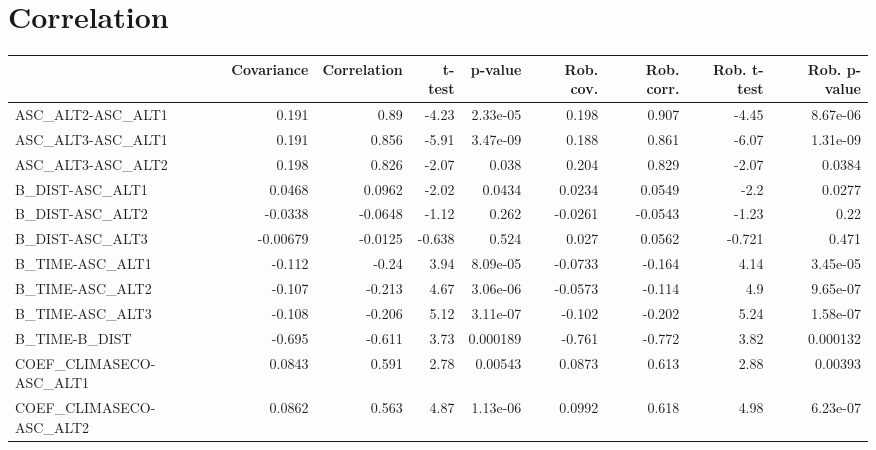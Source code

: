 \section{Correlation}
\begin{tabular}{lrrrrrrrr}
\toprule
{} &  Covariance &  Correlation &  t-test &  p-value &  Rob. cov. &  Rob. corr. &  Rob. t-test &  Rob. p-value \\
\midrule
ASC\_ALT2-ASC\_ALT1              &       0.191 &         0.89 &   -4.23 & 2.33e-05 &      0.198 &       0.907 &        -4.45 &      8.67e-06 \\
ASC\_ALT3-ASC\_ALT1              &       0.191 &        0.856 &   -5.91 & 3.47e-09 &      0.188 &       0.861 &        -6.07 &      1.31e-09 \\
ASC\_ALT3-ASC\_ALT2              &       0.198 &        0.826 &   -2.07 &    0.038 &      0.204 &       0.829 &        -2.07 &        0.0384 \\
B\_DIST-ASC\_ALT1                &      0.0468 &       0.0962 &   -2.02 &   0.0434 &     0.0234 &      0.0549 &         -2.2 &        0.0277 \\
B\_DIST-ASC\_ALT2                &     -0.0338 &      -0.0648 &   -1.12 &    0.262 &    -0.0261 &     -0.0543 &        -1.23 &          0.22 \\
B\_DIST-ASC\_ALT3                &    -0.00679 &      -0.0125 &  -0.638 &    0.524 &      0.027 &      0.0562 &       -0.721 &         0.471 \\
B\_TIME-ASC\_ALT1                &      -0.112 &        -0.24 &    3.94 & 8.09e-05 &    -0.0733 &      -0.164 &         4.14 &      3.45e-05 \\
B\_TIME-ASC\_ALT2                &      -0.107 &       -0.213 &    4.67 & 3.06e-06 &    -0.0573 &      -0.114 &          4.9 &      9.65e-07 \\
B\_TIME-ASC\_ALT3                &      -0.108 &       -0.206 &    5.12 & 3.11e-07 &     -0.102 &      -0.202 &         5.24 &      1.58e-07 \\
B\_TIME-B\_DIST                  &      -0.695 &       -0.611 &    3.73 & 0.000189 &     -0.761 &      -0.772 &         3.82 &      0.000132 \\
COEF\_CLIMASECO-ASC\_ALT1        &      0.0843 &        0.591 &    2.78 &  0.00543 &     0.0873 &       0.613 &         2.88 &       0.00393 \\
COEF\_CLIMASECO-ASC\_ALT2        &      0.0862 &        0.563 &    4.87 & 1.13e-06 &     0.0992 &       0.618 &         4.98 &      6.23e-07 \\

\end{tabular}
